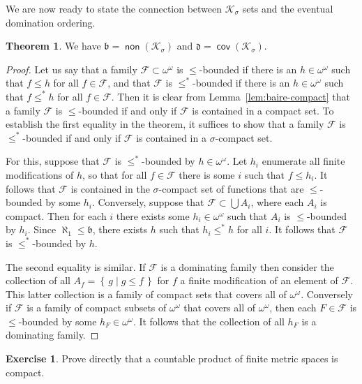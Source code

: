 \documentclass[11pt,oneside]{amsart}
\newcommand{\set}[1]{\left\{\,#1\,\right\}}
\DeclareMathOperator{\non}{\mathsf{non}}
\DeclareMathOperator{\cov}{\mathsf{cov}}
\theoremstyle{definition}
\newtheorem{exerc}{Exercise}[section]
\newtheorem{thm}{Theorem}[section]
\theoremstyle{definition}
\theoremstyle{remark}
\begin{document}
We are now ready to state the connection between $\mathcal K_\sigma$ sets and the eventual domination ordering.

\begin{thm}
  We have $\mathfrak b=\non(\mathcal K_\sigma)$ and $\mathfrak d=\cov(\mathcal K_\sigma)$.
\end{thm}

\begin{proof}
  Let us say that a family $\mathcal F\subset\omega^\omega$ is $\leq$-bounded if there is an $h\in\omega^\omega$ such that $f\leq h$ for all $f\in\mathcal F$, and that $\mathcal F$ is $\leq^*$-bounded if there is an $h\in\omega^\omega$ such that $f\leq^*h$ for all $f\in\mathcal F$. Then it is clear from Lemma~\ref{lem:baire-compact} that a family $\mathcal F$ is $\leq$-bounded if and only if $\mathcal F$ is contained in a compact set. To establish the first equality in the theorem, it suffices to show that a family $\mathcal F$ is $\leq^*$-bounded if and only if $\mathcal F$ is contained in a $\sigma$-compact set.

  For this, suppose that $\mathcal F$ is $\leq^*$-bounded by $h\in\omega^\omega$. Let $h_i$ enumerate all finite modifications of $h$, so that for all $f\in\mathcal F$ there is some $i$ such that $f\leq h_i$. It follows that $\mathcal F$ is contained in the $\sigma$-compact set of functions that are $\leq$-bounded by some $h_i$. Conversely, suppose that $\mathcal F\subset\bigcup A_i$, where each $A_i$ is compact. Then for each $i$ there exists some $h_i\in\omega^\omega$ such that $A_i$ is $\leq$-bounded by $h_i$. Since $\aleph_1\leq\mathfrak b$, there exists $h$ such that $h_i\leq^*h$ for all $i$. It follows that $\mathcal F$ is $\leq^*$-bounded by $h$.

  The second equality is similar. If $\mathcal F$ is a dominating family then consider the collection of all $A_f=\set{g\mid g\leq f}$ for $f$ a finite modification of an element of $\mathcal F$. This latter collection is a family of compact sets that covers all of $\omega^\omega$. Conversely if $\mathcal F$ is a family of compact subsets of $\omega^\omega$ that covers all of $\omega^\omega$, then each $F\in\mathcal F$ is $\leq$-bounded by some $h_F\in\omega^\omega$. It follows that the collection of all $h_F$ is a dominating family.
\end{proof}

\begin{exerc}
  Prove directly that a countable product of finite metric spaces is compact.
\end{exerc}
\end{document}
